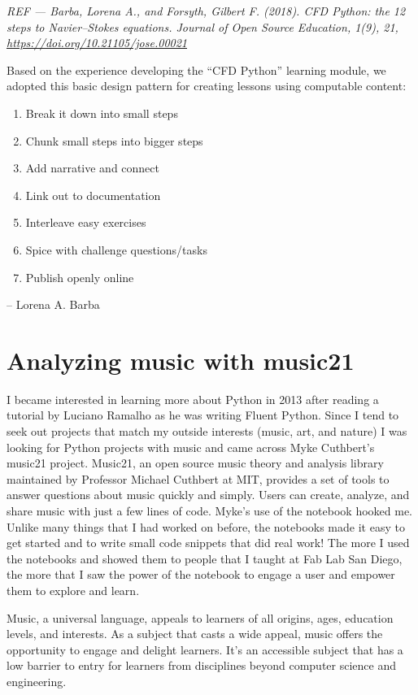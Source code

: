 \documentclass[]{book}
\providecommand{\tightlist}{%
  \setlength{\itemsep}{0pt}\setlength{\parskip}{0pt}}
\begin{document}
\emph{REF --- Barba, Lorena A., and Forsyth, Gilbert F. (2018). CFD Python:
the 12 steps to Navier--Stokes equations. Journal of Open Source
Education, 1(9), 21,
\url{https://doi.org/10.21105/jose.00021}
}

Based on the experience developing the ``CFD Python'' learning module,
we adopted this basic design pattern for creating lessons using
computable content:

\begin{enumerate}
\def\labelenumi{\arabic{enumi}.}
\tightlist
\item
  Break it down into small steps
\item
  Chunk small steps into bigger steps
\item
  Add narrative and connect
\item
  Link out to documentation
\item
  Interleave easy exercises
\item
  Spice with challenge questions/tasks
\item
  Publish openly online
\end{enumerate}

-- Lorena A. Barba

\hypertarget{analyzing-music-with-music21}{%
\section{Analyzing music with music21}\label{analyzing-music-with-music21}}

I became interested in learning more about Python in 2013 after
reading a tutorial by Luciano Ramalho as he was writing Fluent
Python. Since I tend to seek out projects that match my outside
interests (music, art, and nature) I was looking for Python projects
with music and came across Myke Cuthbert's music21 project. Music21,
an open source music theory and analysis library maintained by
Professor Michael Cuthbert at MIT, provides a set of tools to answer
questions about music quickly and simply. Users can create, analyze,
and share music with just a few lines of code. Myke's use of the
notebook hooked me. Unlike many things that I had worked on before,
the notebooks made it easy to get started and to write small code
snippets that did real work! The more I used the notebooks and showed
them to people that I taught at Fab Lab San Diego, the more that I saw
the power of the notebook to engage a user and empower them to explore
and learn.

Music, a universal language, appeals to learners of all origins, ages,
education levels, and interests. As a subject that casts a wide
appeal, music offers the opportunity to engage and delight
learners. It's an accessible subject that has a low barrier to entry
for learners from disciplines beyond computer science and engineering.
\end{document}
